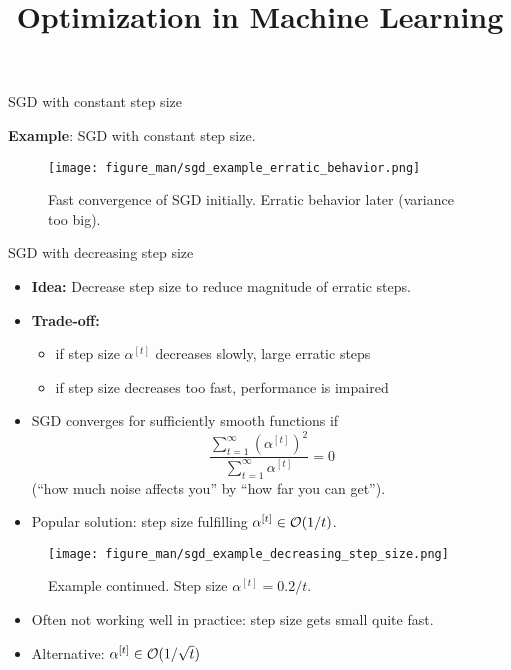 \documentclass[11pt,compress,t,notes=noshow, xcolor=table]{beamer}
\title{Optimization in Machine Learning}
\date{}
\begin{document}
\lecture{\inserttitle}
\sloppy


\begin{vbframe}{SGD with constant step size}

\textbf{Example}: SGD with constant step size. 

\begin{figure}
    \centering
    \texttt{[image: figure\_man/sgd\_example\_erratic\_behavior.png]}
    \caption*{Fast convergence of SGD initially.
        Erratic behavior later (variance too big).}
\end{figure}

\end{vbframe}


\begin{vbframe}{SGD with decreasing step size}

\begin{itemize}
	\item \textbf{Idea:} Decrease step size to reduce magnitude of erratic steps.
	\item \textbf{Trade-off:}
	\begin{itemize}
		\item if step size $\alpha^{[t]}$ decreases slowly, large erratic steps%
		\item if step size decreases too fast, performance is impaired
	\end{itemize}
	\item SGD converges for sufficiently smooth functions if 
	$$
		\frac{\sum_{t = 1}^\infty \left(\alpha^{[t]}\right)^2}{\sum_{t = 1}^\infty \alpha^{[t]}} = 0
	$$
	(\enquote{how much noise affects you} by \enquote{how far you can get}).
\end{itemize}	

\framebreak 

\begin{itemize}
	\item Popular solution: step size fulfilling $\alpha^{[t]} \in \mathcal{O}(1/t)$. 
\end{itemize}

\begin{figure}
    \centering
    \texttt{[image: figure\_man/sgd\_example\_decreasing\_step\_size.png]}
    \caption*{Example continued.
        Step size $\alpha^{[t]} = 0.2/t$. }
\end{figure}

\vspace{-0.5\baselineskip}

\begin{itemize}
 	\item Often not working well in practice: step size gets small quite fast.
 	\item Alternative: $\alpha^{[t]} \in \mathcal{O}(1/\sqrt{t})$
\end{itemize}

\end{vbframe}
\end{document}
